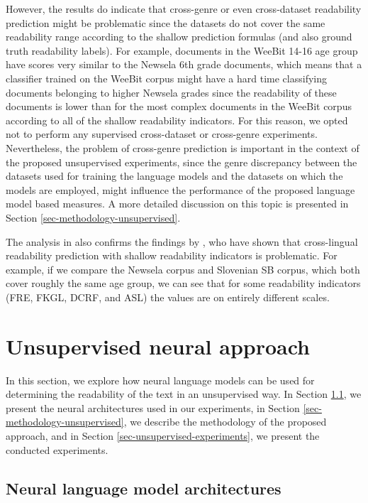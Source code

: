 \documentclass{clv3}
\begin{document}
However, the results do indicate that cross-genre or even cross-dataset readability prediction might be problematic since the datasets do not cover the same readability range according to the shallow prediction formulas (and also ground truth readability labels). For example, documents in the WeeBit 14-16 age group have scores very similar to the Newsela 6th grade documents, which means that a classifier trained on the WeeBit corpus might have a hard time classifying documents belonging to higher Newsela grades since the readability of these documents is lower than for the most complex documents in the WeeBit corpus according to all of the shallow readability indicators. For this reason, we opted not to perform any supervised cross-dataset or cross-genre experiments. Nevertheless, the problem of cross-genre prediction is important in the context of the proposed unsupervised experiments, since the genre discrepancy between the datasets used for training the language models and the datasets on which the models are employed, might influence the performance of the proposed language model based measures. A more detailed discussion on this topic is presented in Section \ref{sec-methodology-unsupervised}.   

The analysis in  also confirms the findings by \citet{madrazo2020cross}, who have shown that cross-lingual readability prediction with shallow readability indicators is problematic. For example, if we compare the Newsela corpus and Slovenian SB corpus, which both cover roughly the same age group, we can see that for some readability indicators (FRE, FKGL, DCRF, and ASL) the values are on entirely different scales. 



\section{Unsupervised neural approach}
\label{sec:unsupervised}

In this section, we explore how neural language models can be used for determining the readability of the text in an unsupervised way. In Section \ref{sec:NLMs}, we present the neural architectures used in our experiments, in Section \ref{sec-methodology-unsupervised}, we describe the methodology of the proposed approach, and in Section \ref{sec-unsupervised-experiments}, we present the conducted experiments.

\subsection{Neural language model architectures}
\label{sec:NLMs}
\end{document}
